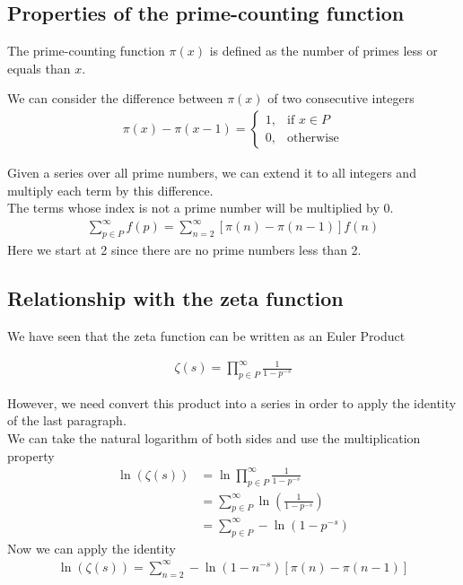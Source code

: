 \documentclass{article}
\begin{document}
\subsection{Properties of the prime-counting function}

The prime-counting function \(\pi(x)\) is defined as the number of primes less or equals than \(x\).

We can consider the difference between \(\pi(x)\) of two consecutive integers
\begin{align*}
    \pi (x)-\pi (x-1)= 
    \begin{cases}
        1,& \text{if } x\in P
        \\
        0,& \text{otherwise}
    \end{cases}
\end{align*}

Given a series over all prime numbers, we can extend it to all integers and multiply each term by this difference.
\\
The terms whose index is not a prime number will be multiplied by 0.
\begin{align*}
    \sum_{p\in P}^{\infty}f(p)=\sum_{n=2}^{\infty}\left[\pi(n)-\pi(n-1)\right]f(n)
\end{align*}
Here we start at 2 since there are no prime numbers less than 2.

\subsection{Relationship with the zeta function}

We have seen that the zeta function can be written as an Euler Product

\begin{align*}
    \zeta (s)=\prod_{p\in P}^{\infty}\frac{1}{1-p^{-s}}
\end{align*}

However, we need convert this product into a series in order to apply the identity of the last paragraph.
\\
We can take the natural logarithm of both sides and use the multiplication property
\begin{align*}
    \ln\left(\zeta (s)\right)&=\ln\prod_{p\in P}^{\infty}\frac{1}{1-p^{-s}}
    \\
    &=\sum_{p\in P}^{\infty}\ln\left(\frac{1}{1-p^{-s}}\right)
    \\
    &=\sum_{p\in P}^{\infty}-\ln\left(1-p^{-s}\right)
\end{align*}
Now we can apply the identity
\begin{align*}
    \ln\left(\zeta (s)\right)=\sum_{n=2}^{\infty}-\ln\left(1-n^{-s}\right)\left[\pi (n) - \pi (n-1)\right]
\end{align*}
\end{document}
